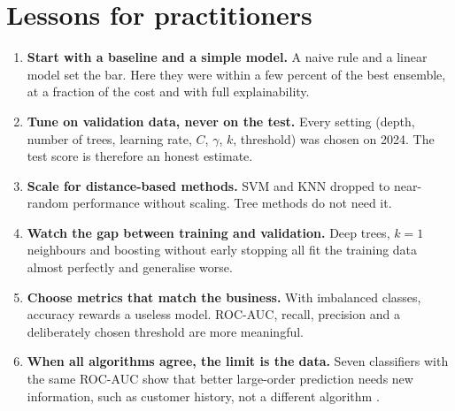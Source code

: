\section{Lessons for practitioners}
\begin{enumerate}
  \item \textbf{Start with a baseline and a simple model.} A naive rule and a linear model set the bar. Here they
        were within a few percent of the best ensemble, at a fraction of the cost and with full explainability.
  \item \textbf{Tune on validation data, never on the test.} Every setting (depth, number of trees, learning
        rate, $C$, $\gamma$, $k$, threshold) was chosen on 2024. The test score is therefore an honest estimate.
  \item \textbf{Scale for distance-based methods.} SVM and KNN dropped to near-random performance without
        scaling. Tree methods do not need it.
  \item \textbf{Watch the gap between training and validation.} Deep trees, $k=1$ neighbours and boosting without
        early stopping all fit the training data almost perfectly and generalise worse.
  \item \textbf{Choose metrics that match the business.} With imbalanced classes, accuracy rewards a useless
        model. ROC-AUC, recall, precision and a deliberately chosen threshold are more meaningful.
  \item \textbf{When all algorithms agree, the limit is the data.} Seven classifiers with the same ROC-AUC show
        that better large-order prediction needs new information, such as customer history, not a different
        algorithm \citep{kelleher2020, geron2022}.
\end{enumerate}
